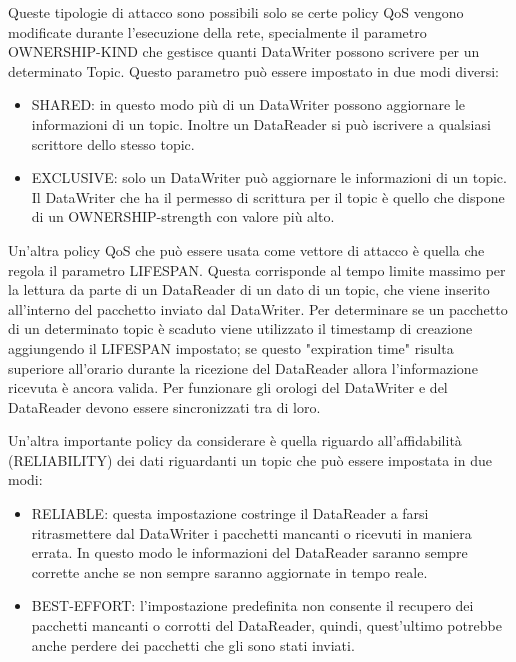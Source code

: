 Queste tipologie di attacco sono possibili solo se certe policy QoS vengono
modificate durante l'esecuzione della rete, specialmente il parametro
OWNERSHIP-KIND che gestisce quanti DataWriter possono scrivere per un
determinato Topic. Questo parametro può essere impostato in due modi diversi:
\begin{itemize}
    \item SHARED: in questo modo più di un DataWriter possono aggiornare le
    informazioni di un topic. Inoltre un DataReader si può iscrivere a
    qualsiasi scrittore dello stesso topic.
    \item EXCLUSIVE: solo un DataWriter può aggiornare le informazioni di un
    topic. Il DataWriter che ha il permesso di scrittura per il topic è quello
    che dispone di un OWNERSHIP-strength con valore più alto.
\end{itemize}


Un'altra policy QoS che può essere usata come vettore di attacco è quella
che regola il parametro LIFESPAN. Questa corrisponde al tempo limite massimo per la
lettura da parte di un DataReader di un dato di un topic, che viene inserito
all'interno del pacchetto inviato dal DataWriter. Per determinare se un pacchetto
di un determinato topic è scaduto viene utilizzato il timestamp di creazione
aggiungendo il LIFESPAN impostato; se questo "expiration time" risulta
superiore all'orario durante la ricezione del DataReader allora l'informazione
ricevuta è ancora valida. Per funzionare gli orologi del DataWriter e del DataReader
devono essere sincronizzati tra di loro.






Un'altra importante policy da considerare è quella riguardo all'affidabilità
(RELIABILITY) dei dati riguardanti un topic che può essere impostata in due
modi:
\begin{itemize}
    \item RELIABLE: questa impostazione costringe il DataReader a farsi
    ritrasmettere dal DataWriter i pacchetti mancanti o ricevuti in maniera errata.
    In questo modo le informazioni del DataReader saranno sempre corrette anche
    se non sempre saranno aggiornate in tempo reale.
    \item BEST-EFFORT: l'impostazione predefinita non consente il recupero
    dei pacchetti mancanti o corrotti
    del DataReader, quindi, quest'ultimo potrebbe anche perdere dei pacchetti 
    che gli sono stati inviati.
\end{itemize}




